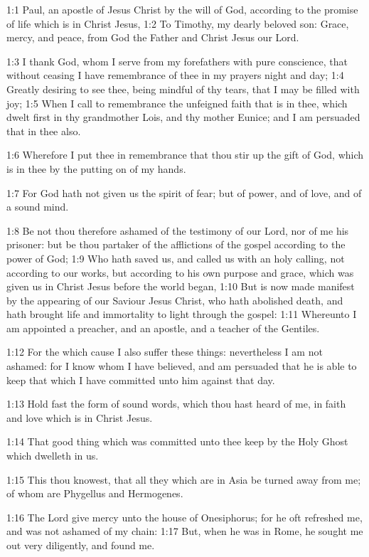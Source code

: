 

1:1 Paul, an apostle of Jesus Christ by the will of God, according to
the promise of life which is in Christ Jesus, 1:2 To Timothy,
my dearly beloved son: Grace, mercy, and peace, from God the Father
and Christ Jesus our Lord.

1:3 I thank God, whom I serve from my forefathers with pure
conscience, that without ceasing I have remembrance of thee in my
prayers night and day; 1:4 Greatly desiring to see thee, being mindful
of thy tears, that I may be filled with joy; 1:5 When I call to
remembrance the unfeigned faith that is in thee, which dwelt first in
thy grandmother Lois, and thy mother Eunice; and I am persuaded that
in thee also.

1:6 Wherefore I put thee in remembrance that thou stir up the gift of
God, which is in thee by the putting on of my hands.

1:7 For God hath not given us the spirit of fear; but of power, and of
love, and of a sound mind.

1:8 Be not thou therefore ashamed of the testimony of our Lord, nor of
me his prisoner: but be thou partaker of the afflictions of the gospel
according to the power of God; 1:9 Who hath saved us, and called us
with an holy calling, not according to our works, but according to his
own purpose and grace, which was given us in Christ Jesus before the
world began, 1:10 But is now made manifest by the appearing of our
Saviour Jesus Christ, who hath abolished death, and hath brought life
and immortality to light through the gospel: 1:11 Whereunto I am
appointed a preacher, and an apostle, and a teacher of the Gentiles.

1:12 For the which cause I also suffer these things: nevertheless I am
not ashamed: for I know whom I have believed, and am persuaded that he
is able to keep that which I have committed unto him against that day.

1:13 Hold fast the form of sound words, which thou hast heard of me,
in faith and love which is in Christ Jesus.

1:14 That good thing which was committed unto thee keep by the Holy
Ghost which dwelleth in us.

1:15 This thou knowest, that all they which are in Asia be turned away
from me; of whom are Phygellus and Hermogenes.

1:16 The Lord give mercy unto the house of Onesiphorus; for he oft
refreshed me, and was not ashamed of my chain: 1:17 But, when he was
in Rome, he sought me out very diligently, and found me.

